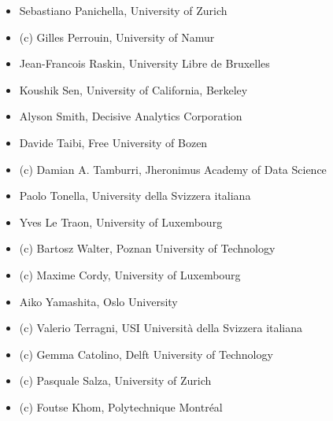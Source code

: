 \begin{itemize}[itemsep=0.5em]
	\item Sebastiano Panichella, University of Zurich
	\item (c) Gilles Perrouin, University of Namur
	\item Jean-Francois Raskin, University Libre de Bruxelles
	\item Koushik Sen, University of California, Berkeley
	\item Alyson Smith, Decisive Analytics Corporation
	\item Davide Taibi, Free University of Bozen
	\item (c) Damian A. Tamburri, Jheronimus Academy of Data Science
	\item Paolo Tonella, University della Svizzera italiana
	\item Yves Le Traon, University of Luxembourg
	\item (c) Bartosz Walter, Poznan University of Technology
	\item (c) Maxime Cordy, University of Luxembourg
	\item Aiko Yamashita, Oslo University
	\item (c) Valerio Terragni, USI Università della Svizzera italiana
	\item (c) Gemma Catolino, Delft University of Technology
	\item (c) Pasquale Salza, University of Zurich
	\item (c) Foutse Khom, Polytechnique Montréal
\end{itemize}
